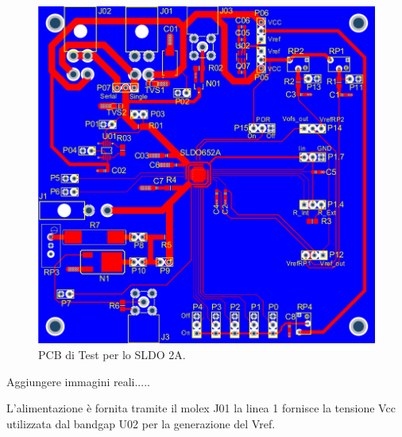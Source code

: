 \begin{figure}
\centering
\includegraphics[scale=.3]{Immagini/chipcard}
\caption{PCB di Test per lo SLDO 2A.}
\label{PCBTestSLDO}
\end{figure}

Aggiungere immagini reali.....

L'alimentazione è fornita tramite il molex J01 la linea 1 fornisce la tensione Vcc utilizzata dal bandgap U02 per la generazione del Vref.

